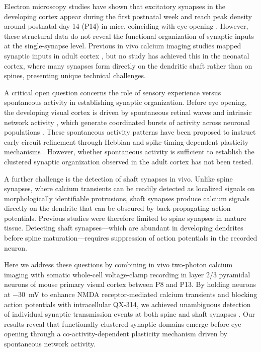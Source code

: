 \documentclass[11pt]{article}
\begin{document}
Electron microscopy studies have shown that excitatory synapses in the developing cortex appear during the first postnatal week and reach peak density around postnatal day 14 (P14) in mice, coinciding with eye opening \citep{lendvai2000experience}. However, these structural data do not reveal the functional organization of synaptic inputs at the single-synapse level. Previous in vivo calcium imaging studies mapped synaptic inputs in adult cortex \citep{jia2010dendritic, wilson2016orientation}, but no study has achieved this in the neonatal cortex, where many synapses form directly on the dendritic shaft rather than on spines, presenting unique technical challenges.

A critical open question concerns the role of sensory experience versus spontaneous activity in establishing synaptic organization. Before eye opening, the developing visual cortex is driven by spontaneous retinal waves and intrinsic network activity \citep{blankenship2010mechanisms}, which generate coordinated bursts of activity across neuronal populations \citep{valeeva2019emergence}. These spontaneous activity patterns have been proposed to instruct early circuit refinement through Hebbian and spike-timing-dependent plasticity mechanisms \citep{hebb1949organization, markram1997regulation}. However, whether spontaneous activity is sufficient to establish the clustered synaptic organization observed in the adult cortex has not been tested.

A further challenge is the detection of shaft synapses in vivo. Unlike spine synapses, where calcium transients can be readily detected as localized signals on morphologically identifiable protrusions, shaft synapses produce calcium signals directly on the dendrite that can be obscured by back-propagating action potentials. Previous studies were therefore limited to spine synapses in mature tissue. Detecting shaft synapses---which are abundant in developing dendrites before spine maturation---requires suppression of action potentials in the recorded neuron.

Here we address these questions by combining in vivo two-photon calcium imaging with somatic whole-cell voltage-clamp recording in layer 2/3 pyramidal neurons of mouse primary visual cortex between P8 and P13. By holding neurons at $-30$~mV to enhance NMDA receptor-mediated calcium transients and blocking action potentials with intracellular QX-314, we achieved unambiguous detection of individual synaptic transmission events at both spine and shaft synapses \citep{kleindienst2011activity, winnubst2015spontaneous}. Our results reveal that functionally clustered synaptic domains emerge before eye opening through a co-activity-dependent plasticity mechanism driven by spontaneous network activity.
\end{document}
